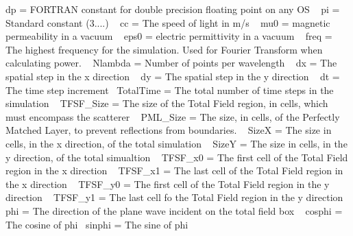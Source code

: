 dp = F\+O\+R\+T\+R\+A\+N constant for double precision floating point on any O\+S ~\newline
 pi = Standard constant (3....) ~\newline
 cc = The speed of light in m/s ~\newline
 mu0 = magnetic permeability in a vacuum ~\newline
 eps0 = electric permittivity in a vacuum ~\newline
 freq = The highest frequency for the simulation. Used for Fourier Transform when calculating power. ~\newline
 Nlambda = Number of points per wavelength ~\newline
 dx = The spatial step in the x direction ~\newline
 dy = The spatial step in the y direction ~\newline
 dt = The time step increment~\newline
 Total\+Time = The total number of time steps in the simulation ~\newline
 T\+F\+S\+F\+\_\+\+Size = The size of the Total Field region, in cells, which must encompass the scatterer ~\newline
 P\+M\+L\+\_\+\+Size = The size, in cells, of the Perfectly Matched Layer, to prevent reflections from boundaries. ~\newline
 Size\+X = The size in cells, in the x direction, of the total simulation ~\newline
 Size\+Y = The size in cells, in the y direction, of the total simualtion ~\newline
 T\+F\+S\+F\+\_\+x0 = The first cell of the Total Field region in the x direction ~\newline
 T\+F\+S\+F\+\_\+x1 = The last cell of the Total Field region in the x direction ~\newline
 T\+F\+S\+F\+\_\+y0 = The first cell of the Total Field region in the y direction ~\newline
 T\+F\+S\+F\+\_\+y1 = The last cell fo the Total Field region in the y direction ~\newline
 phi = The direction of the plane wave incident on the total field box ~\newline
 cosphi = The cosine of phi~\newline
 sinphi = The sine of phi~\newline
 